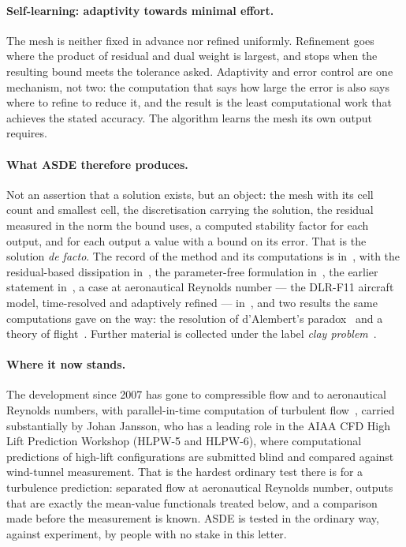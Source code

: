 \documentclass[11pt]{article}
\begin{document}
\paragraph{Self-learning: adaptivity towards minimal effort.} The mesh is neither fixed in advance
nor refined uniformly. Refinement goes where the product of residual and dual weight is largest,
and stops when the resulting bound meets the tolerance asked. Adaptivity and error control are one
mechanism, not two: the computation that says how large the error is also says where to refine to
reduce it, and the result is the least computational work that achieves the stated accuracy. The
algorithm learns the mesh its own output requires.

\paragraph{What ASDE therefore produces.} Not an assertion that a solution exists, but an object:
the mesh with its cell count and smallest cell, the discretisation carrying the solution, the
residual measured in the norm the bound uses, a computed stability factor for each output, and for
each output a value with a bound on its error. That is the solution \emph{de facto}. The record of
the method and its computations is in~\cite{cfd}, with the residual-based dissipation
in~\cite{hjv}, the parameter-free formulation in~\cite{hjja}, the earlier statement
in~\cite{newapproach}, a case at aeronautical Reynolds number --- the DLR-F11 aircraft model,
time-resolved and adaptively refined --- in~\cite{dlrf11}, and two results the same computations
gave on the way: the resolution of d'Alembert's paradox~\cite{dalembert} and a theory of
flight~\cite{flight}. Further material is collected under the
label \emph{clay problem}~\cite{blog}.

\paragraph{Where it now stands.} The development since 2007 has gone to compressible flow and to
aeronautical Reynolds numbers, with parallel-in-time computation of turbulent
flow~\cite{paralleltime}, carried substantially by Johan Jansson, who has a leading role in
the AIAA CFD High Lift Prediction Workshop (HLPW-5 and HLPW-6), where computational predictions of
high-lift configurations are submitted blind and compared against wind-tunnel measurement. That is
the hardest ordinary test there is for a turbulence prediction: separated flow at aeronautical
Reynolds number, outputs that are exactly the mean-value functionals treated below, and a
comparison made before the measurement is known. ASDE is tested in the ordinary way, against
experiment, by people with no stake in this letter.
\end{document}
